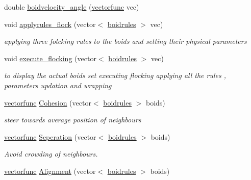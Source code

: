 \begin{DoxyCompactItemize}
double \mbox{\hyperlink{classboidrules_a8c50a648361809de6a75a94c76f0bea9}{boidvelocity\+\_\+angle}} (\mbox{\hyperlink{classvectorfunc}{vectorfunc}} vec)
\item 
\mbox{\label{classboidrules_a58d1b50a478847d0a295e298fa2d7b32}} 
void \mbox{\hyperlink{classboidrules_a58d1b50a478847d0a295e298fa2d7b32}{applyrules\+\_\+flock}} (vector$<$ \mbox{\hyperlink{classboidrules}{boidrules}} $>$ vec)
\begin{DoxyCompactList}\small\item\em applying three folcking rules to the boids and setting their physical parameters \end{DoxyCompactList}\item 
\mbox{\label{classboidrules_a8184f1f98ababa77fd2976c58f9278a0}} 
void \mbox{\hyperlink{classboidrules_a8184f1f98ababa77fd2976c58f9278a0}{execute\+\_\+flocking}} (vector$<$ \mbox{\hyperlink{classboidrules}{boidrules}} $>$ vec)
\begin{DoxyCompactList}\small\item\em to display the actual boids set executing flocking applying all the rules , parameters updation and wrapping \end{DoxyCompactList}\item 
\mbox{\hyperlink{classvectorfunc}{vectorfunc}} \mbox{\hyperlink{classboidrules_af85434ba6abc026215ac7e8d5ff586e4}{Cohesion}} (vector$<$ \mbox{\hyperlink{classboidrules}{boidrules}} $>$ boids)
\begin{DoxyCompactList}\small\item\em steer towards average position of neighbours \end{DoxyCompactList}\item 
\mbox{\label{classboidrules_a8d6420dcc0f0c98cd8fc8400947c54ed}} 
\mbox{\hyperlink{classvectorfunc}{vectorfunc}} \mbox{\hyperlink{classboidrules_a8d6420dcc0f0c98cd8fc8400947c54ed}{Seperation}} (vector$<$ \mbox{\hyperlink{classboidrules}{boidrules}} $>$ boids)
\begin{DoxyCompactList}\small\item\em Avoid crowding of neighbours. \end{DoxyCompactList}\item 
\mbox{\hyperlink{classvectorfunc}{vectorfunc}} \mbox{\hyperlink{classboidrules_a923af948aad8d8679eddfcc461760e6e}{Alignment}} (vector$<$ \mbox{\hyperlink{classboidrules}{boidrules}} $>$ boids)

\end{DoxyCompactItemize}
